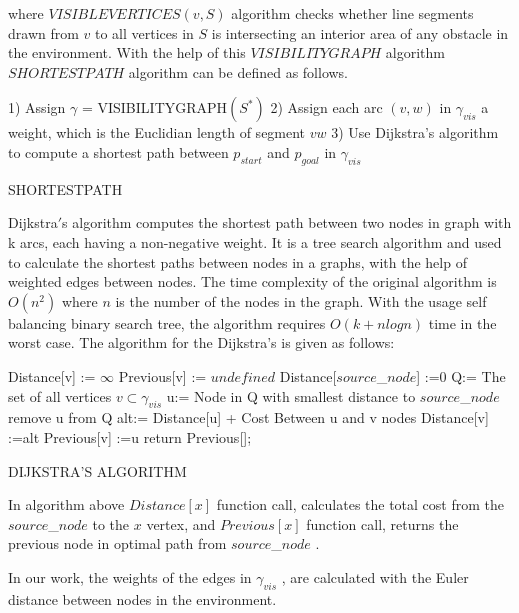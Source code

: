 where $VISIBLEVERTICES(v,S)$ algorithm checks whether line segments drawn from $v$ to all vertices in $S$ is intersecting an interior area of any obstacle in the environment. With the help of this $VISIBILITYGRAPH$ algorithm $SHORTESTPATH$ algorithm can be defined as follows.
	
\begin{algorithm}[H]
1) Assign $\gamma$ = VISIBILITYGRAPH$(S^*)$
2) Assign each arc $(v,w)$ in $\gamma_{vis}$ a weight, which is the Euclidian length of segment $vw$
3) Use Dijkstra's algorithm to compute a shortest path between $p_{start}$ and $p_{goal}$ in $\gamma_{vis}$
\caption{SHORTESTPATH}
\end{algorithm}
	
Dijkstra$'$s algorithm computes the shortest path between two nodes in
graph with k arcs, each having a non-negative weight. It is a tree search algorithm and  used to calculate the shortest paths between nodes in a graphs, with the help of weighted edges between nodes. The time complexity of the original algorithm is $O(n^2)$ where $n$ is the number of the nodes in the graph. With the usage self balancing binary search tree, the algorithm requires $O(k+nlogn)$ time in the worst case. The algorithm for the Dijkstra's is given as follows:
	
\begin{algorithm}[H]
{		
Distance[v] := $\infty$ \;
Previous[v] := $undefined$ \;
}
Distance[$source$\_$ node$] :=0  \;
Q:= The set of all vertices $v \subset \gamma_{vis}$ \;
{
u:= Node in Q with smallest distance to $source$\_$ node$\;
remove u from Q\;
{
alt:= Distance[u] + Cost Between u and v nodes\;
{
Distance[v] :=alt\;
Previous[v] :=u\;
}
}
}
return Previous[];
\caption{DIJKSTRA'S ALGORITHM}
\end{algorithm}

In algorithm above $Distance[x]$ function call, calculates the total cost from the $source$\_$ node$ to the $x$ vertex, and $Previous[x]$ function call, returns the previous node in optimal path from $source$\_$ node$ .

In our work, the weights of the edges in $\gamma_{vis}$ , are calculated with the Euler distance between nodes in the environment.  


